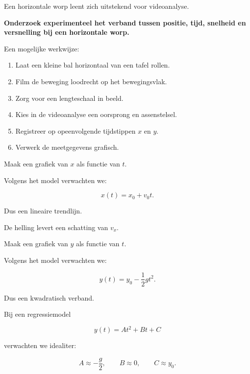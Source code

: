 \documentclass{ximera}
\begin{document}


Een horizontale worp leent zich uitstekend voor videoanalyse.

\textbf{Onderzoek experimenteel het verband tussen positie, tijd, snelheid en versnelling bij een horizontale worp.}



Een mogelijke werkwijze:

\begin{enumerate}
  \item Laat een kleine bal horizontaal van een tafel rollen.
  \item Film de beweging loodrecht op het bewegingsvlak.
  \item Zorg voor een lengteschaal in beeld.
  \item Kies in de videoanalyse een oorsprong en assenstelsel.
  \item Registreer op opeenvolgende tijdstippen $x$ en $y$.
  \item Verwerk de meetgegevens grafisch.
\end{enumerate}



Maak een grafiek van $x$ als functie van $t$.

Volgens het model verwachten we:

\[
x(t)=x_0+v_0t.
\]

Dus een lineaire trendlijn.

De helling levert een schatting van $v_x$.



Maak een grafiek van $y$ als functie van $t$.

Volgens het model verwachten we:

\[
y(t)=y_0-\frac12gt^2.
\]

Dus een kwadratisch verband.

Bij een regressiemodel

\[
y(t)=At^2+Bt+C
\]

verwachten we idealiter:

\[
A\approx-\frac g2,
\qquad
B\approx0,
\qquad
C\approx y_0.
\]
\end{document}
